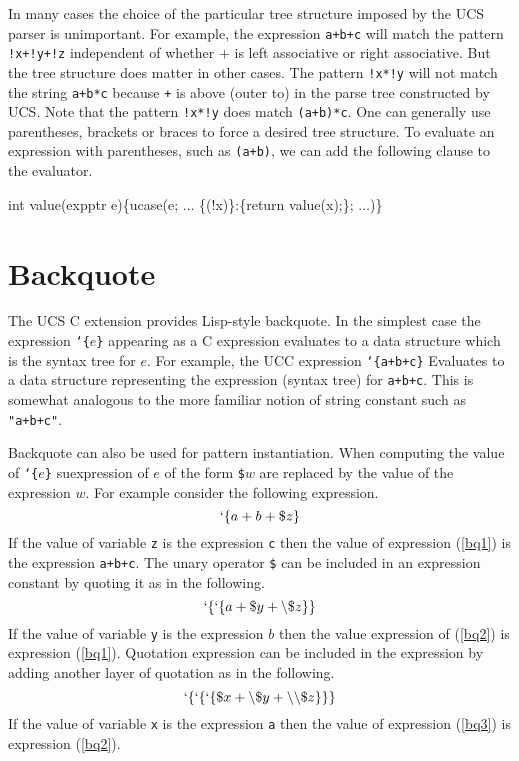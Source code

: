 \documentclass{article}
\newcommand{\mtt}[1]{\mbox{\tt #1}}
\begin{document}
In many cases the choice of the particular tree structure imposed by the UCS parser is unimportant.  For example, the expression \mtt{a+b+c} will match the pattern
\mtt{!x+!y+!z} independent of whether + is left associative or right associative.  But the tree structure does matter in other cases.  The pattern \mtt{!x*!y}
will not match the string \mtt{a+b*c} because \mtt{+} is above (outer to) \mtt{*} in the parse tree constructed by UCS. Note that the pattern \mtt{!x*!y} does match \mtt{(a+b)*c}.
One can generally use parentheses, brackets or braces to force a desired tree structure.
To evaluate an expression with parentheses, such as \mtt{(a+b)}, we can add the following clause to the evaluator.

\begin{code}
int value(expptr e)\{ucase(e; $\ldots$ \{(!x)\}:\{return value(x);\}; $\ldots$)\}
\end{code}

\section{Backquote}

The UCS C extension provides Lisp-style backquote.
In the simplest case the expression \mtt{`\{$e$\}} appearing as a C expression evaluates to a data structure which is the syntax tree for
$e$.  For example, the UCC expression \mtt{`\{a+b+c\}}
Evaluates to a data structure representing the expression (syntax tree) for \mtt{a+b+c}.  This is somewhat analogous to the more familiar
notion of string constant such as \mtt{"a+b+c"}.

Backquote can also be used for pattern instantiation.
When computing the value of \mtt{`\{$e$\}} suexpression of $e$ of the form \mtt{\$$w$} are replaced by the value of the expression $w$.
For example consider the following expression.
\begin{equation}
\label{bq1}
`\{a+b+\$z\}
\end{equation}
If the value of variable \mtt{z} is the expression \mtt{c} then the value of expression (\ref{bq1}) is the expression \mtt{a+b+c}.
The unary operator \mtt{\$} can be included in an expression constant by quoting it as in the following.
\begin{equation}
\label{bq2}
`\{`\{a + \$y + \backslash\$z\}\}
\end{equation}
If the value of variable \mtt{y} is the expression $b$ then the value expression of (\ref{bq2}) is expression (\ref{bq1}).
Quotation expression can be included in the expression by adding another layer of quotation as in the following.
\begin{equation}
\label{bq3}
`\{`\{`\{\$x + \backslash\$y + \backslash\backslash\$z\}\}\}
\end{equation}
If the value of variable \mtt{x} is the expression \mtt{a} then the value of expression (\ref{bq3}) is expression (\ref{bq2}).
\end{document}
